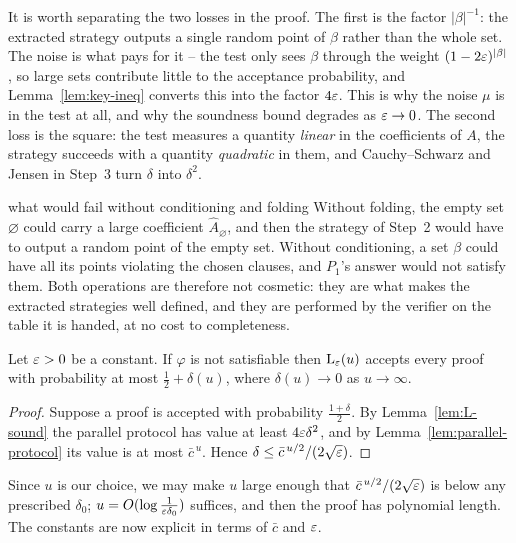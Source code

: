 \noindent
It is worth separating the two losses in the proof.  The first is the factor $|\beta|^{-1}$: the extracted strategy outputs a single random point of $\beta$ rather than the whole set.  The noise is what pays for it -- the test only sees $\beta$ through the weight $(1-2\varepsilon)^{|\beta|}$, so large sets contribute little to the acceptance probability, and Lemma~\ref{lem:key-ineq} converts this into the factor $4\varepsilon$.  This is why the noise $\mu$ is in the test at all, and why the soundness bound degrades as $\varepsilon\to0$.  The second loss is the square: the test measures a quantity \emph{linear} in the coefficients of $A$, the strategy succeeds with a quantity \emph{quadratic} in them, and Cauchy--Schwarz and Jensen in Step~3 turn $\delta$ into $\delta^2$.

\begin{pitfall}{what would fail without conditioning and folding}
Without folding, the empty set $\varnothing$ could carry a large coefficient $\widehat A_\varnothing$, and then the strategy of Step~2 would have to output a random point of the empty set.
Without conditioning, a set $\beta$ could have all its points violating the chosen clauses, and $P_1$'s answer would not satisfy them.
Both operations are therefore not cosmetic: they are what makes the extracted strategies well defined, and they are performed by the verifier on the table it is handed, at no cost to completeness.
\end{pitfall}

\begin{theorem}\label{thm:L-sound-consequence}
Let $\varepsilon>0$ be a constant.  If $\varphi$ is not satisfiable then $\mathrm{L}_\varepsilon(u)$ accepts every proof with probability at most $\tfrac12+\delta(u)$, where $\delta(u)\to0$ as $u\to\infty$.
\end{theorem}
\begin{proof}
Suppose a proof is accepted with probability $\tfrac{1+\delta}{2}$.  By Lemma~\ref{lem:L-sound} the parallel protocol has value at least $4\varepsilon\delta^2$, and by Lemma~\ref{lem:parallel-protocol} its value is at most $\bar c^{\,u}$.  Hence $\delta\le\bar c^{\,u/2}/(2\sqrt{\varepsilon})$.
\end{proof}

\noindent
Since $u$ is our choice, we may make $u$ large enough that $\bar c^{\,u/2}/(2\sqrt{\varepsilon})$ is below any prescribed $\delta_0$; $u=O(\log\frac1{\varepsilon\delta_0})$ suffices, and then the proof has polynomial length.  The constants are now explicit in terms of $\bar c$ and $\varepsilon$.


